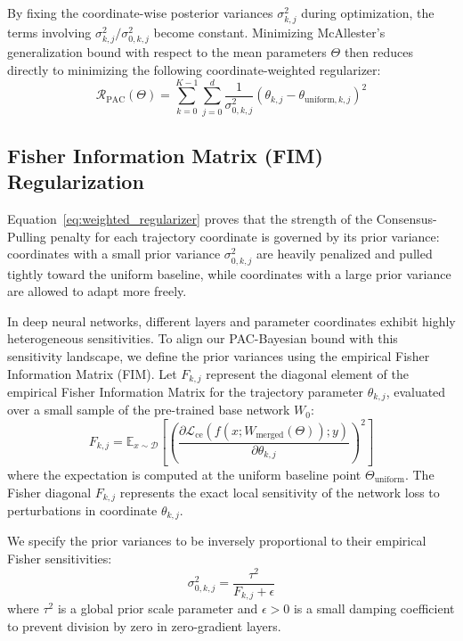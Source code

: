 By fixing the coordinate-wise posterior variances $\sigma_{k, j}^2$ during optimization, the terms involving $\sigma_{k, j}^2 / \sigma_{0, k, j}^2$ become constant. Minimizing McAllester's generalization bound with respect to the mean parameters $\Theta$ then reduces directly to minimizing the following coordinate-weighted regularizer:
\begin{equation}
\label{eq:weighted_regularizer}
\mathcal{R}_{\text{PAC}}(\Theta) = \sum_{k=0}^{K-1} \sum_{j=0}^d \frac{1}{\sigma_{0, k, j}^2} (\theta_{k,j} - \theta_{\text{uniform}, k, j})^2
\end{equation}

\subsection{Fisher Information Matrix (FIM) Regularization}
Equation~\eqref{eq:weighted_regularizer} proves that the strength of the Consensus-Pulling penalty for each trajectory coordinate is governed by its prior variance: coordinates with a small prior variance $\sigma_{0, k, j}^2$ are heavily penalized and pulled tightly toward the uniform baseline, while coordinates with a large prior variance are allowed to adapt more freely.

In deep neural networks, different layers and parameter coordinates exhibit highly heterogeneous sensitivities. To align our PAC-Bayesian bound with this sensitivity landscape, we define the prior variances using the empirical Fisher Information Matrix (FIM). Let $F_{k, j}$ represent the diagonal element of the empirical Fisher Information Matrix for the trajectory parameter $\theta_{k, j}$, evaluated over a small sample of the pre-trained base network $W_0$:
\begin{equation}
F_{k, j} = \mathbb{E}_{x \sim \mathcal{D}}\left[ \left( \frac{\partial \mathcal{L}_{\text{ce}}\left(f(x; W_{\text{merged}}(\Theta)); y\right)}{\partial \theta_{k, j}} \right)^2 \right]
\end{equation}
where the expectation is computed at the uniform baseline point $\Theta_{\text{uniform}}$. The Fisher diagonal $F_{k, j}$ represents the exact local sensitivity of the network loss to perturbations in coordinate $\theta_{k, j}$.

We specify the prior variances to be inversely proportional to their empirical Fisher sensitivities:
\begin{equation}
\sigma_{0, k, j}^2 = \frac{\tau^2}{F_{k, j} + \epsilon}
\end{equation}
where $\tau^2$ is a global prior scale parameter and $\epsilon > 0$ is a small damping coefficient to prevent division by zero in zero-gradient layers.

